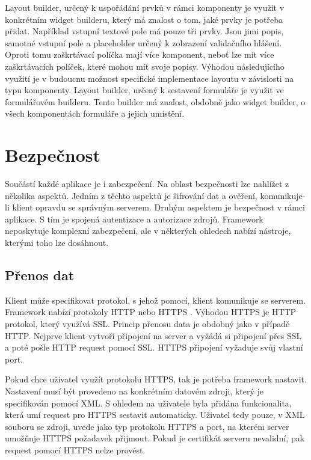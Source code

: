 Layout builder, určený k uspořádání prvků v rámci komponenty je využit v konkrétním widget builderu, který má znalost o tom, jaké prvky je potřeba přidat. Například vstupní textové pole má pouze tři prvky. Jsou jimi popis, samotné vstupní pole a placeholder určený k zobrazení validačního hlášení. Oproti tomu zaškrtávací políčka mají více komponent, neboť lze mít více zaškrtávacích políček, které mohou mít svoje popisy. Výhodou následujícího využití je v budoucnu možnost specifické implementace layoutu v závislosti na typu komponenty. Layout builder, určený k sestavení formuláře je využit ve formulářovém builderu. Tento builder má znalost, obdobně jako widget builder, o všech komponentách formuláře a jejich umístění. 

\section{Bezpečnost}
Součástí každé aplikace je i zabezpečení. Na oblast bezpečnosti lze nahlížet z několika aspektů. Jedním z těchto aspektů je šifrování dat a ověření, komunikuje-li klient opravdu se správným serverem. Druhým aspektem je bezpečnost v rámci aplikace. S tím je spojená autentizace a autorizace zdrojů. Framework neposkytuje komplexní zabezpečení, ale v některých ohledech nabízí nástroje, kterými toho lze dosáhnout.

\subsection{Přenos dat}
Klient může specifikovat protokol, s jehož pomocí, klient komunikuje se serverem. Framework nabízí protokoly HTTP nebo HTTPS \cite{https}. Výhodou HTTPS je HTTP protokol, který využívá SSL. Princip přenosu data je obdobný jako v případě HTTP. Nejprve klient vytvoří připojení na server a vyžádá si připojení přes SSL a poté pošle HTTP request pomocí SSL. HTTPS připojení vyžaduje svůj vlastní port. 

Pokud chce uživatel využít protokolu HTTPS, tak je potřeba framework nastavit. Nastavení musí být provedeno na konkrétním datovém zdroji, který je specifikován pomocí XML. S ohledem na uživatele byla přidána funkcionalita, která umí request pro HTTPS sestavit automaticky. Uživatel tedy pouze, v XML souboru se zdroji, uvede jako typ protokolu HTTPS a port, na kterém server umožňuje HTTPS požadavek přijmout. Pokud je certifikát serveru nevalidní, pak request pomocí HTTPS nelze provést.

